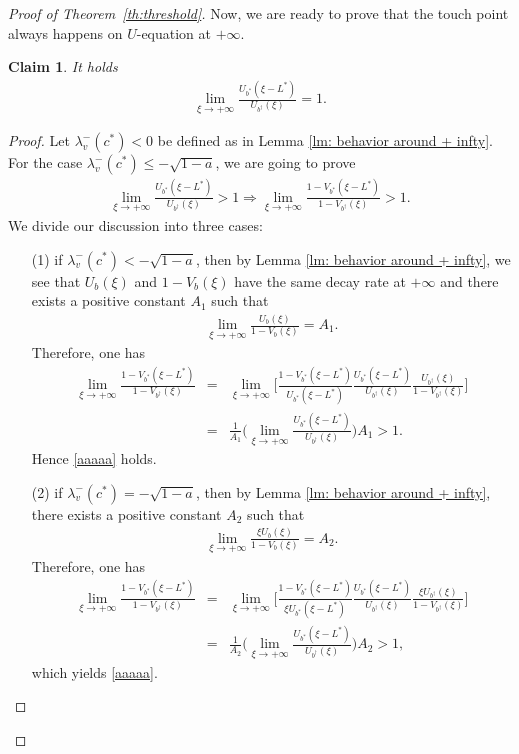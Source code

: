 \documentclass[11pt,a4paper]{article}
\newtheorem{claim}[theorem]{\textbf{Claim}}
\numberwithin{equation}{section}
\numberwithin{figure}{section}
\newcommand\bea{\begin{eqnarray}}
\newcommand\eea{\end{eqnarray}}
\newcommand\beaa{\begin{eqnarray*}}
\newcommand\eeaa{\end{eqnarray*}}
\begin{document}
\begin{proof}[Proof of Theorem~\ref{th:threshold}]
Now, we are  ready to prove that the touch point always happens on $U$-equation at $+\infty$.
\begin{claim}\label{claim 2 of proof of th 1.5}
It holds
\beaa
\lim_{\xi\to+\infty}\frac{U_{b^*}(\xi-L^*)}{U_{b^\dag}(\xi)}=1.
\eeaa
\end{claim}
\begin{proof}
Let $\lambda_v^-(c^*)<0$ be defined as in Lemma \ref{lm: behavior around + infty}. For the case $\lambda_v^-(c^*)\le -\sqrt{1-a}$,
we are going to prove
\bea\label{aaaaa}
\lim_{\xi\to+\infty}\frac{U_{b^*}(\xi-L^*)}{U_{b^\dag}(\xi)}>1\Longrightarrow \lim_{\xi\to+\infty}\frac{1-V_{b^*}(\xi-L^*)}{1-V_{b^\dag}(\xi)}>1.
\eea
We divide our discussion into three cases:
\begin{itemize}
    \item[(1)] if $\lambda_v^-(c^*)< -\sqrt{1-a}$, then by Lemma \ref{lm: behavior around + infty},
    we see that $U_b(\xi)$ and $1-V_b(\xi)$ have the same decay rate at $+\infty$ and there exists a positive constant $A_1$ such that
    \beaa
    \lim_{\xi\to+\infty}\frac{U_{b}(\xi)}{1-V_b(\xi)}=A_1.
    \eeaa
    Therefore, one has
    \beaa
     \lim_{\xi\to+\infty}\frac{1-V_{b^*}(\xi-L^*)}{1-V_{b^\dag}(\xi)}&=&
     \lim_{\xi\to+\infty}\Big[\frac{1-V_{b^*}(\xi-L^*)}{U_{b^*}(\xi-L^*)}\frac{U_{b^*}(\xi-L^*)}{U_{b^\dag}(\xi)}
     \frac{U_{b^\dag}(\xi)}{1-V_{b^\dag}(\xi)}\Big]\\
     &=&\frac{1}{A_1}\Big(\lim_{\xi\to+\infty}\frac{U_{b^*}(\xi-L^*)}{U_{b^\dag}(\xi)}\Big)A_1>1.
    \eeaa
    Hence \eqref{aaaaa} holds.

    \item[(2)] if $\lambda_v^-(c^*)= -\sqrt{1-a}$, then by Lemma \ref{lm: behavior around + infty}, there exists a positive constant $A_2$ such that
    \beaa
    \lim_{\xi\to+\infty}\frac{\xi U_{b}(\xi)}{1-V_b(\xi)}=A_2.
    \eeaa
     Therefore, one has
    \beaa
     \lim_{\xi\to+\infty}\frac{1-V_{b^*}(\xi-L^*)}{1-V_{b^\dag}(\xi)}&=&
     \lim_{\xi\to+\infty}\Big[\frac{1-V_{b^*}(\xi-L^*)}{\xi U_{b^*}(\xi-L^*)}\frac{ U_{b^*}(\xi-L^*)}{U_{b^\dag}(\xi)}
     \frac{\xi U_{b^\dag}(\xi)}{1-V_{b^\dag}(\xi)}\Big]\\
     &=&\frac{1}{A_2}\Big(\lim_{\xi\to+\infty}\frac{U_{b^*}(\xi-L^*)}{U_{b^\dag}(\xi)}\Big)A_2>1,
    \eeaa
    which yields \eqref{aaaaa}.


\end{itemize}
\end{proof}
\end{proof}
\end{document}
